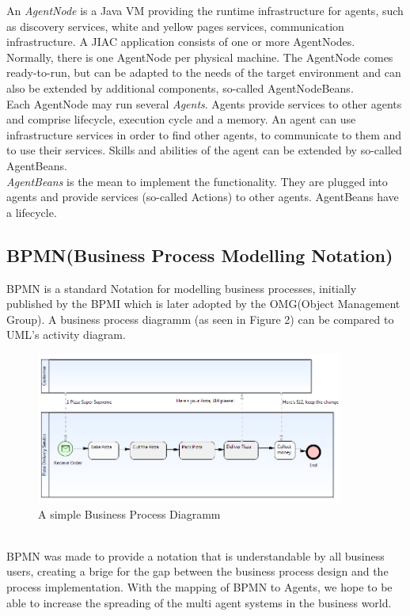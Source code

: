 An \textit{AgentNode} is a Java VM providing the runtime infrastructure for agents, such
as discovery services, white and yellow pages services, communication infrastructure. A
JIAC application consists of one or more AgentNodes. Normally, there is one AgentNode
per physical machine. The AgentNode comes ready-to-run, but can be adapted to the
needs of the target environment and can also be extended by additional components,
so-called AgentNodeBeans.\\
Each AgentNode may run several \textit{Agents}. Agents provide services to other agents
and comprise lifecycle, execution cycle and a memory. An agent can use infrastructure
services in order to find other agents, to communicate to them and to use their services.
Skills and abilities of the agent can be extended by so-called AgentBeans.\\
\textit{AgentBeans} is the mean to implement the functionality. They are plugged into agents
and provide services (so-called Actions) to other agents. AgentBeans have a lifecycle.

\subsection{BPMN(Business Process Modelling Notation)}
BPMN \cite{6} is a standard Notation for modelling business processes, initially published by the BPMI which is later adopted by the OMG(Object Management Group). A business process diagramm (as seen in Figure 2) can be compared to UML's activity diagram.
\begin{figure}[h]
	\centering
		\includegraphics[width=0.90\textwidth]{images/bpmn_sampl.png}
	\caption{A simple Business Process Diagramm}
	\label{fig:bpmn_sampl}
\end{figure}\\
BPMN was made to provide a notation that is understandable by all business users, creating a brige for the gap between the business process design and the process implementation. With the mapping of BPMN to Agents, we hope to be able to increase the spreading of the multi agent systems in the business world.

